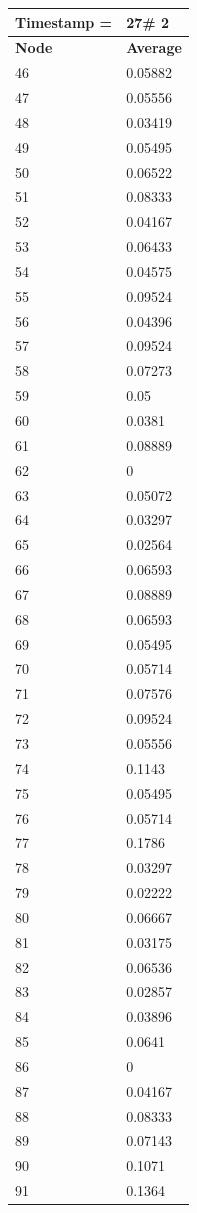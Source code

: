 \begin{tabular}{|l||l|}
\hline
\textbf{Timestamp =} & \textbf{27}\# 2\\\hline
	\textbf{Node} & \textbf{Average} \\ \hline
\hline
	46 & 0.05882 \\ \hline
	47 & 0.05556 \\ \hline
	48 & 0.03419 \\ \hline
	49 & 0.05495 \\ \hline
	50 & 0.06522 \\ \hline
	51 & 0.08333 \\ \hline
	52 & 0.04167 \\ \hline
	53 & 0.06433 \\ \hline
	54 & 0.04575 \\ \hline
	55 & 0.09524 \\ \hline
	56 & 0.04396 \\ \hline
	57 & 0.09524 \\ \hline
	58 & 0.07273 \\ \hline
	59 & 0.05 \\ \hline
	60 & 0.0381 \\ \hline
	61 & 0.08889 \\ \hline
	62 & 0 \\ \hline
	63 & 0.05072 \\ \hline
	64 & 0.03297 \\ \hline
	65 & 0.02564 \\ \hline
	66 & 0.06593 \\ \hline
	67 & 0.08889 \\ \hline
	68 & 0.06593 \\ \hline
	69 & 0.05495 \\ \hline
	70 & 0.05714 \\ \hline
	71 & 0.07576 \\ \hline
	72 & 0.09524 \\ \hline
	73 & 0.05556 \\ \hline
	74 & 0.1143 \\ \hline
	75 & 0.05495 \\ \hline
	76 & 0.05714 \\ \hline
	77 & 0.1786 \\ \hline
	78 & 0.03297 \\ \hline
	79 & 0.02222 \\ \hline
	80 & 0.06667 \\ \hline
	81 & 0.03175 \\ \hline
	82 & 0.06536 \\ \hline
	83 & 0.02857 \\ \hline
	84 & 0.03896 \\ \hline
	85 & 0.0641 \\ \hline
	86 & 0 \\ \hline
	87 & 0.04167 \\ \hline
	88 & 0.08333 \\ \hline
	89 & 0.07143 \\ \hline
	90 & 0.1071 \\ \hline
	91 & 0.1364 \\ \hline
\end{tabular}
